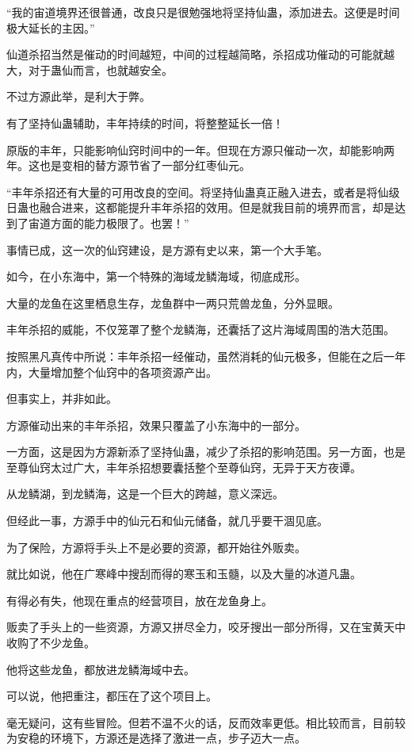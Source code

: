 \begin{this_body}
“我的宙道境界还很普通，改良只是很勉强地将坚持仙蛊，添加进去。这便是时间极大延长的主因。”

仙道杀招当然是催动的时间越短，中间的过程越简略，杀招成功催动的可能就越大，对于蛊仙而言，也就越安全。

不过方源此举，是利大于弊。

有了坚持仙蛊辅助，丰年持续的时间，将整整延长一倍！

原版的丰年，只能影响仙窍时间中的一年。但现在方源只催动一次，却能影响两年。这也是变相的替方源节省了一部分红枣仙元。

“丰年杀招还有大量的可用改良的空间。将坚持仙蛊真正融入进去，或者是将仙级日蛊也融合进来，这都能提升丰年杀招的效用。但是就我目前的境界而言，却是达到了宙道方面的能力极限了。也罢！”

事情已成，这一次的仙窍建设，是方源有史以来，第一个大手笔。

如今，在小东海中，第一个特殊的海域龙鳞海域，彻底成形。

大量的龙鱼在这里栖息生存，龙鱼群中一两只荒兽龙鱼，分外显眼。

丰年杀招的威能，不仅笼罩了整个龙鳞海，还囊括了这片海域周围的浩大范围。

按照黑凡真传中所说：丰年杀招一经催动，虽然消耗的仙元极多，但能在之后一年内，大量增加整个仙窍中的各项资源产出。

但事实上，并非如此。

方源催动出来的丰年杀招，效果只覆盖了小东海中的一部分。

一方面，这是因为方源新添了坚持仙蛊，减少了杀招的影响范围。另一方面，也是至尊仙窍太过广大，丰年杀招想要囊括整个至尊仙窍，无异于天方夜谭。

从龙鳞湖，到龙鳞海，这是一个巨大的跨越，意义深远。

但经此一事，方源手中的仙元石和仙元储备，就几乎要干涸见底。

为了保险，方源将手头上不是必要的资源，都开始往外贩卖。

就比如说，他在广寒峰中搜刮而得的寒玉和玉髓，以及大量的冰道凡蛊。

有得必有失，他现在重点的经营项目，放在龙鱼身上。

贩卖了手头上的一些资源，方源又拼尽全力，咬牙搜出一部分所得，又在宝黄天中收购了不少龙鱼。

他将这些龙鱼，都放进龙鳞海域中去。

可以说，他把重注，都压在了这个项目上。

毫无疑问，这有些冒险。但若不温不火的话，反而效率更低。相比较而言，目前较为安稳的环境下，方源还是选择了激进一点，步子迈大一点。


\end{this_body}
